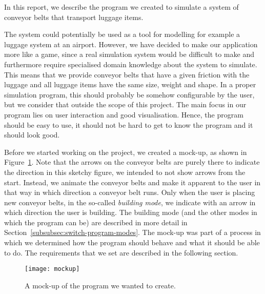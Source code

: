 In this report, we describe the program we created to simulate a system of conveyor belts that transport luggage items.

The system could potentially be used as a tool for modelling for example a luggage system at an airport. However, we have decided to make our application more like a game, since a real simulation system would be difficult to make and furthermore require specialised domain knowledge about the system to simulate. This means that we provide conveyor belts that have a given friction with the luggage and all luggage items have the same size, weight and shape. In a proper simulation program, this should probably be somehow configurable by the user, but we consider that outside the scope of this project. The main focus in our program lies on user interaction and good visualisation. Hence, the program should be easy to use, it should not be hard to get to know the program and it should look good.

Before we started working on the project, we created a mock-up, as shown in Figure~\ref{fig:mockup}. Note that the arrows on the conveyor belts are purely there to indicate the direction in this sketchy figure, we intended to not show arrows from the start. Instead, we animate the conveyor belts and make it apparent to the user in that way in which direction a conveyor belt runs. Only when the user is placing new conveyor belts, in the so-called \emph{building mode}, we indicate with an arrow in which direction the user is building. The building mode (and the other modes in which the program can be) are described in more detail in Section~\ref{subsubsec:switch-program-modes}. The mock-up was part of a process in which we determined how the program should behave and what it should be able to do. The requirements that we set are described in the following section.

\begin{figure}[b!]
  \begin{center}
    \texttt{[image: mockup]}
    \caption{A mock-up of the program we wanted to create.}
    \label{fig:mockup}
  \end{center}
\end{figure}


